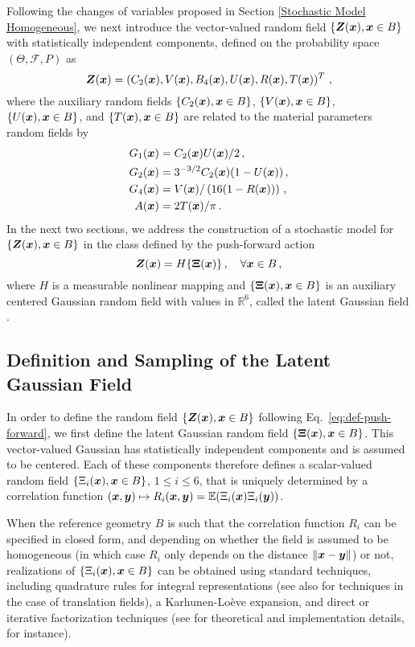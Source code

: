 Following the changes of variables proposed in Section \ref{Stochastic Model Homogeneous}, we next introduce the vector-valued random field $\{\boldsymbol{Z}(\boldsymbol{x}), \boldsymbol{x} \in B\}$ with statistically independent components, defined on the probability space $(\Theta, \mathcal{F}, P)$ as
\begin{equation}
    \boldsymbol{Z}(\boldsymbol{x}) = (C_2(\boldsymbol{x}), V(\boldsymbol{x}), B_4(\boldsymbol{x}), U(\boldsymbol{x}), R(\boldsymbol{x}), T(\boldsymbol{x}))^T~,
\end{equation}
where the auxiliary random fields $\{C_2(\boldsymbol{x}), \boldsymbol{x} \in B\}$, $\{V(\boldsymbol{x}), \boldsymbol{x} \in B\}$, $\{U(\boldsymbol{x}), \boldsymbol{x} \in B\}$, and $\{T(\boldsymbol{x}), \boldsymbol{x} \in B\}$ are related to the material parameters random fields by 
\begin{align}
    G_1(\boldsymbol{x}) & = C_2(\boldsymbol{x}) U(\boldsymbol{x}) /2\,,\\
    G_2(\boldsymbol{x}) & = 3^{-3/2} C_2(\boldsymbol{x}) (1 - U(\boldsymbol{x}))\,,\\
    G_4(\boldsymbol{x}) & = V(\boldsymbol{x})/\left(16(1-R(\boldsymbol{x}))\right)\,,\\
    A(\boldsymbol{x}) & = 2T(\boldsymbol{x})/\pi\,.
\end{align}
In the next two sections, we address the construction of a stochastic model for $\{\boldsymbol{Z}(\boldsymbol{x}), \boldsymbol{x} \in B\}$ in the class defined by the push-forward action
\begin{equation}
    \boldsymbol{Z}(\boldsymbol{x}) = H \{{\bf \Xi}(\boldsymbol{x})\}\,, \quad \forall \boldsymbol{x} \in B\,,
\end{equation}
where $H$ is a measurable nonlinear mapping and $\{{\bf \Xi}(\boldsymbol{x}), \boldsymbol{x} \in B\}$ is an auxiliary centered Gaussian random field with values in $\mathbb{R}^6$, called the latent Gaussian field \cite{GrigoriuBook}.

\subsection{Definition and Sampling of the Latent Gaussian Field}\label{subsec:def-Gaussian}

In order to define the random field $\{\boldsymbol{Z}(\boldsymbol{x}), \boldsymbol{x} \in B\}$ following Eq.~\eqref{eq:def-push-forward}, we first define the latent Gaussian random field $\{{\bf \Xi}(\boldsymbol{x}), \boldsymbol{x} \in B\}$. This vector-valued Gaussian has statistically independent components and is assumed to be centered. Each of these components therefore defines a scalar-valued random field $\{\Xi_i(\boldsymbol{x}), \boldsymbol{x} \in B\}$, $1 \leq i \leq 6$, that is uniquely determined by a correlation function $(\boldsymbol{x}, \boldsymbol{y}) \mapsto R_i(\boldsymbol{x}, \boldsymbol{y}) = \mathbb{E}(\Xi_i(\boldsymbol{x}) \Xi_i(\boldsymbol{y}))$. 

When the reference geometry $B$ is such that the correlation function $R_i$ can be specified in closed form, and depending on whether the field is assumed to be homogeneous (in which case $R_i$ only depends on the distance $\|\boldsymbol{x} - \boldsymbol{y}\|$) or not, realizations of $\{\Xi_i(\boldsymbol{x}), \boldsymbol{x} \in B\}$ can be obtained using standard techniques, including quadrature rules for integral representations \cite{Shinozuka1991,Poirion1995} (see also \cite{Bocchini2008,SHIELDS2011511} for techniques in the case of translation fields), a Karhunen-Lo\`eve expansion, and direct or iterative factorization techniques (see \cite{lord_powell_shardlow_2014} for theoretical and implementation details, for instance). 

